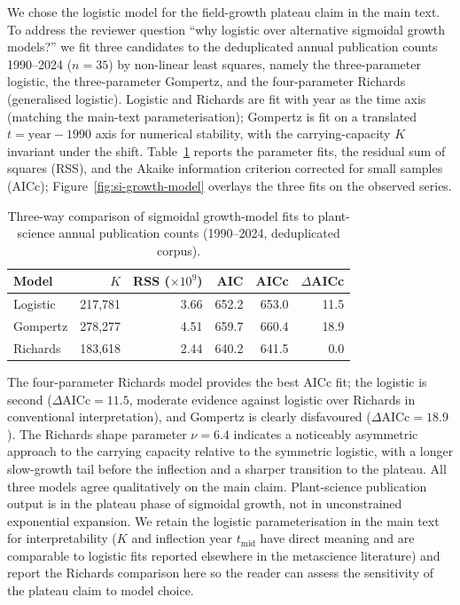 We chose the logistic model for the field-growth plateau claim in the
main text. To address the reviewer question ``why logistic over
alternative sigmoidal growth models?'' we fit three candidates to the
deduplicated annual publication counts 1990--2024
($n = 35$) by non-linear least squares, namely the three-parameter logistic,
the three-parameter Gompertz, and the four-parameter Richards
(generalised logistic). Logistic and Richards are fit with year as the
time axis (matching the main-text parameterisation); Gompertz is fit on
a translated $t = \mathrm{year}-1990$ axis for numerical stability, with
the carrying-capacity $K$ invariant under the shift.
Table~\ref{tab:si-growth-model-fits} reports the parameter fits, the residual sum of
squares (RSS), and the Akaike information criterion corrected for small
samples (AICc); Figure~\ref{fig:si-growth-model} overlays the three fits on
the observed series.

\begin{table}[H]
\centering
\caption{Three-way comparison of sigmoidal growth-model fits to
plant-science annual publication counts (1990--2024, deduplicated corpus).}
\label{tab:si-growth-model-fits}
\begin{tabular}{lrrrrr}
\toprule
Model & $K$ & RSS ($\times 10^9$) & AIC & AICc & $\Delta$AICc \\
\midrule
Logistic  & 217{,}781 & 3.66 & 652.2 & 653.0 & 11.5 \\
Gompertz  & 278{,}277 & 4.51 & 659.7 & 660.4 & 18.9 \\
Richards  & 183{,}618 & 2.44 & 640.2 & 641.5 &  0.0 \\
\bottomrule
\end{tabular}
\end{table}
The four-parameter Richards model provides the best AICc fit; the
logistic is second ($\Delta\mathrm{AICc} = 11.5$, moderate evidence
against logistic over Richards in conventional interpretation), and
Gompertz is clearly disfavoured ($\Delta\mathrm{AICc} = 18.9$).
The Richards shape parameter $\nu = 6.4$ indicates a noticeably
asymmetric approach to the carrying capacity relative to the symmetric
logistic, with a longer slow-growth tail before the inflection and a
sharper transition to the plateau. All three models agree qualitatively
on the main claim. Plant-science publication output is in the plateau
phase of sigmoidal growth, not in unconstrained exponential expansion.
We retain the logistic parameterisation in the main text for
interpretability ($K$ and inflection year $t_{\mathrm{mid}}$ have direct
meaning and are comparable to logistic fits reported elsewhere in the
metascience literature) and report the Richards comparison here so the
reader can assess the sensitivity of the plateau claim to model choice.

